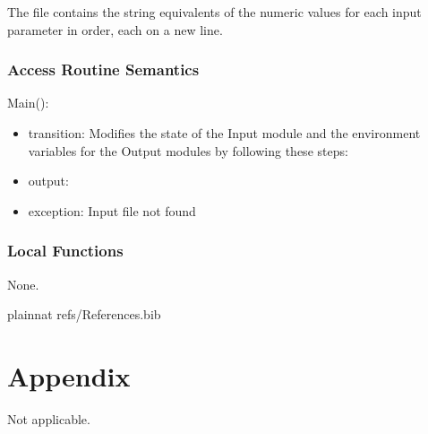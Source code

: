 \documentclass[12pt, titlepage]{article}
\begin{document}
The file contains the string equivalents of the numeric values for each input parameter
in order, each on a new line.



\subsubsection{Access Routine Semantics}

\noindent Main():  
\begin{itemize}
\item transition: Modifies the state of the Input module and the environment variables for the Output modules by following these steps:
\item output: 
\item exception:  Input file not found
\end{itemize}

\subsubsection{Local Functions}

None.

\newpage

 {plainnat}
 {refs/References.bib}

\newpage

\section{Appendix} \label{Appendix}

Not applicable.
\end{document}
